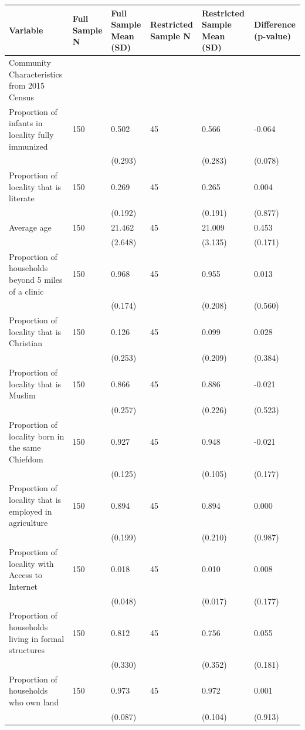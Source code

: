 
\begin{tabular}{llllll}
\toprule
Variable & Full Sample N & Full Sample Mean (SD) & Restricted Sample N & Restricted Sample Mean (SD) & Difference (p-value)\\
\midrule
Community Characteristics from 2015 Census &  &  &  &  & \\
Proportion of infants in locality fully immunized & 150 & 0.502 & 45 & 0.566 & -0.064\\
 &  & (0.293) &  & (0.283) & (0.078)\\
Proportion of locality that is literate & 150 & 0.269 & 45 & 0.265 & 0.004\\
 &  & (0.192) &  & (0.191) & (0.877)\\
\addlinespace
Average age & 150 & 21.462 & 45 & 21.009 & 0.453\\
 &  & (2.648) &  & (3.135) & (0.171)\\
Proportion of households beyond 5 miles of a clinic & 150 & 0.968 & 45 & 0.955 & 0.013\\
 &  & (0.174) &  & (0.208) & (0.560)\\
Proportion of locality that is Christian & 150 & 0.126 & 45 & 0.099 & 0.028\\
\addlinespace
 &  & (0.253) &  & (0.209) & (0.384)\\
Proportion of locality that is Muslim & 150 & 0.866 & 45 & 0.886 & -0.021\\
 &  & (0.257) &  & (0.226) & (0.523)\\
Proportion of locality born in the same Chiefdom & 150 & 0.927 & 45 & 0.948 & -0.021\\
 &  & (0.125) &  & (0.105) & (0.177)\\
\addlinespace
Proportion of locality that is employed in agriculture & 150 & 0.894 & 45 & 0.894 & 0.000\\
 &  & (0.199) &  & (0.210) & (0.987)\\
Proportion of locality with Access to Internet & 150 & 0.018 & 45 & 0.010 & 0.008\\
 &  & (0.048) &  & (0.017) & (0.177)\\
Proportion of households living in formal structures & 150 & 0.812 & 45 & 0.756 & 0.055\\
\addlinespace
 &  & (0.330) &  & (0.352) & (0.181)\\
Proportion of households who own land & 150 & 0.973 & 45 & 0.972 & 0.001\\
 &  & (0.087) &  & (0.104) & (0.913)\\

\end{tabular}

